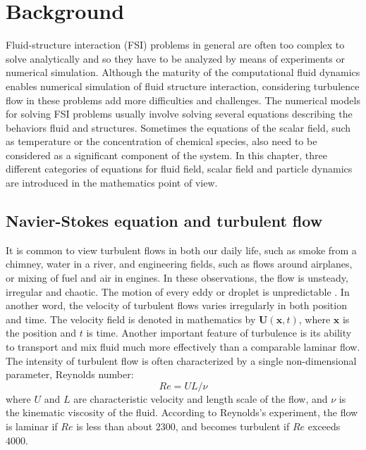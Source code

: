 \chapter{Background}\label{background}
Fluid-structure interaction (FSI) problems in general are often too complex to solve analytically and so they have to be analyzed by means of experiments or numerical simulation. Although the maturity of the computational fluid dynamics enables numerical simulation of fluid structure interaction, considering turbulence flow in these problems add more difficulties and challenges. The numerical models for solving FSI problems usually involve solving several equations describing the behaviors fluid and structures. Sometimes the equations of the scalar field, such as temperature or the concentration of chemical species, also need to be considered as a significant component of the system. In this chapter, three different categories of equations for fluid field, scalar field and particle dynamics are introduced in the mathematics point of view.

\section{Navier-Stokes equation and turbulent flow}
It is common to view turbulent flows in both our daily life, such as smoke from a chimney, water in a river, and engineering fields, such as flows around airplanes, or mixing of fuel and air in engines. In these observations, the flow is unsteady, irregular and chaotic. The motion of every eddy or droplet is unpredictable \cite{PopeTurbulent2000}. In another word, the velocity of turbulent flows varies irregularly in both position and time. The velocity field is denoted in mathematics by $\mathbf{U}(\mathbf{x},t)$, where $\mathbf{x}$ is the position and $t$ is time. Another important feature of turbulence is its ability to transport and mix fluid much more effectively than a comparable laminar flow. The intensity of turbulent flow is often characterized by a single non-dimensional parameter, Reynolds number\cite{Reynolds1894}: 
\begin{equation}
Re = U L / \nu
\label{ReynoldsNumber}
\end{equation}
where $U$ and $L$ are characteristic velocity and length scale of the flow, and $\nu$ is the kinematic viscosity of the fluid. According to Reynolds's experiment, the flow is laminar if $Re$ is less than about $2300$, and becomes turbulent if $Re$ exceeds $4000$.

